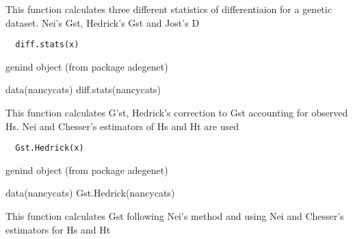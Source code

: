 \documentclass[letterpaper]{book}
\begin{document}
%
\begin{Description}\relax
This function calculates three different statistics of
differentiaion for a genetic dataset. Nei's Gst,
Hedrick's Gst and Jost's D
\end{Description}
%
\begin{Usage}
\begin{verbatim}
  diff.stats(x)
\end{verbatim}
\end{Usage}
%
\begin{Arguments}
\begin{ldescription}
\item[\code{x}] genind object (from package adegenet)
\end{ldescription}
\end{Arguments}
%
\begin{Examples}
\begin{ExampleCode}
data(nancycats)
diff.stats(nancycats)
\end{ExampleCode}
\end{Examples}
%
\begin{Description}\relax
This function calculates G'st, Hedrick's correction to
Gst accounting for observed Hs. Nei and Chesser's
estimators of Hs and Ht are used
\end{Description}
%
\begin{Usage}
\begin{verbatim}
  Gst.Hedrick(x)
\end{verbatim}
\end{Usage}
%
\begin{Arguments}
\begin{ldescription}
\item[\code{x}] genind object (from package adegenet)
\end{ldescription}
\end{Arguments}
%
\begin{Examples}
\begin{ExampleCode}
data(nancycats)
Gst.Hedrick(nancycats)
\end{ExampleCode}
\end{Examples}
%
\begin{Description}\relax
This function calculates Gst following Nei's method and
using Nei and Chesser's estimators for Hs and Ht
\end{Description}
\end{document}
